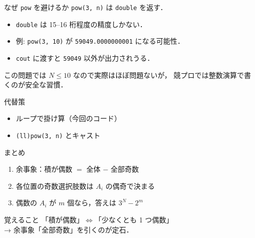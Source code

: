 \documentclass[dvipdfmx,aspectratio=169]{beamer}
\begin{document}
\begin{frame}{なぜ \texttt{pow} を避けるか}
  \texttt{pow(3, n)} は \texttt{double} を返す．

  \vspace{0.6em}
  \begin{itemize}
    \item \texttt{double} は 15--16 桁程度の精度しかない．
    \item 例: \texttt{pow(3, 10)} が \texttt{59049.0000000001} になる可能性．
    \item \texttt{cout} に渡すと \texttt{59049} 以外が出力されうる．
  \end{itemize}

  \vspace{0.8em}
  この問題では $N \le 10$ なので実際はほぼ問題ないが，
  競プロでは整数演算で書くのが安全な習慣．

  \vspace{0.6em}
  \begin{block}{代替策}
    \begin{itemize}
      \item ループで掛け算（今回のコード）
      \item \texttt{(ll)pow(3, n)} とキャスト
    \end{itemize}
  \end{block}
\end{frame}

\begin{frame}{まとめ}
  \begin{enumerate}
    \item 余事象：積が偶数 $=$ 全体 $-$ 全部奇数
    \item 各位置の奇数選択肢数は $A_i$ の偶奇で決まる
    \item 偶数の $A_i$ が $m$ 個なら，答えは $3^N - 2^m$
  \end{enumerate}

  \vspace{1em}
  \begin{block}{覚えること}
    「積が偶数」$\Leftrightarrow$「少なくとも 1 つ偶数」\\
    → 余事象「全部奇数」を引くのが定石．
  \end{block}
\end{frame}
\end{document}
